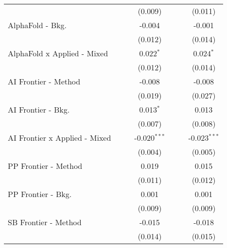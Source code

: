 \begin{tabular}{lcccccc}
                                  &         &             & (0.009)        &              &         & (0.011)\\   
   AlphaFold - Bkg.               &         &             & -0.004         &              &         & -0.001\\   
                                  &         &             & (0.012)        &              &         & (0.014)\\   
   AlphaFold x Applied - Mixed    &         &             & 0.022$^{*}$    &              &         & 0.024$^{*}$\\   
                                  &         &             & (0.012)        &              &         & (0.014)\\   
   AI Frontier - Method           &         &             & -0.008         &              &         & -0.008\\   
                                  &         &             & (0.019)        &              &         & (0.027)\\   
   AI Frontier - Bkg.             &         &             & 0.013$^{*}$    &              &         & 0.013\\   
                                  &         &             & (0.007)        &              &         & (0.008)\\   
   AI Frontier x Applied - Mixed  &         &             & -0.020$^{***}$ &              &         & -0.023$^{***}$\\   
                                  &         &             & (0.004)        &              &         & (0.005)\\   
   PP Frontier - Method           &         &             & 0.019          &              &         & 0.015\\   
                                  &         &             & (0.011)        &              &         & (0.012)\\   
   PP Frontier - Bkg.             &         &             & 0.001          &              &         & 0.001\\   
                                  &         &             & (0.009)        &              &         & (0.009)\\   
   SB Frontier - Method           &         &             & -0.015         &              &         & -0.018\\   
                                  &         &             & (0.014)        &              &         & (0.015)\\   

\end{tabular}
